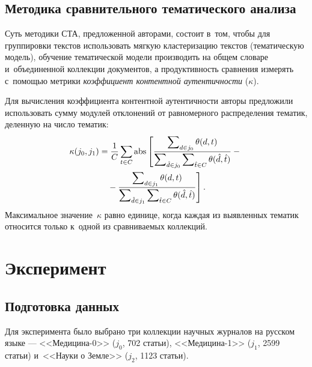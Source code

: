 \begin{multicols}{2}
    \subsection{Методика сравнительного тематического анализа}
    
  
    Суть методики СТА, предложенной авторами, состоит в~том, чтобы для 
группировки текстов использовать мягкую кластеризацию текстов (тематическую 
модель), обучение тематической модели производить на общем словаре 
и~объединенной коллекции документов, а продуктивность сравнения измерять с~помощью 
метрики \textit{коэффициент контентной аутентичности} ($\kappa$).

  
    Для вычисления коэффициента контентной аутентичности авторы предложили 
использовать сумму модулей отклонений от равномерного распределения тематик, 
деленную на число тематик:
    \begin{multline*}
    \kappa (j_0,j_1) = \displaystyle\frac{\displaystyle 1\mathstrut}{\displaystyle C\mathstrut} \sum\limits_{t \in C} \mathrm{abs} 
    \left[ \displaystyle\frac{\displaystyle \sum\nolimits_{d \in 
j_0} \theta(d,t)\mathstrut}{\displaystyle \sum\nolimits_{\hat{d} \in j_0}\sum\nolimits_{\hat{t} \in C} 
\theta(\hat{d},\hat{t})\mathstrut} -{}\right.\\
\left.{}- \displaystyle\frac{\displaystyle \sum\nolimits_{d \in j_1} \theta(d,t)\mathstrut}{\displaystyle \sum\nolimits_{\hat{d} \in 
j_1}\sum\nolimits_{\hat{t} \in C} \theta(\hat{d},\hat{t})\mathstrut} \right].
    \end{multline*}
    Максимальное значение~$\kappa$ равно единице, когда каждая из выявленных 
тематик относится только к~одной из сравниваемых коллекций.
    
    \section{Эксперимент}
    
    \subsection{Подготовка данных}\label{sec:data}
    Для эксперимента было выбрано три коллекции научных журналов на русском 
языке --- <<\mbox{Ме\-ди\-ци\-на-0}>> ($j_0$, 702 статьи), <<Медицина-1>> ($j_1$, 2599 
статьи) и~<<Науки о Земле>> ($j_2$, 1123 статьи). 


\end{multicols}
